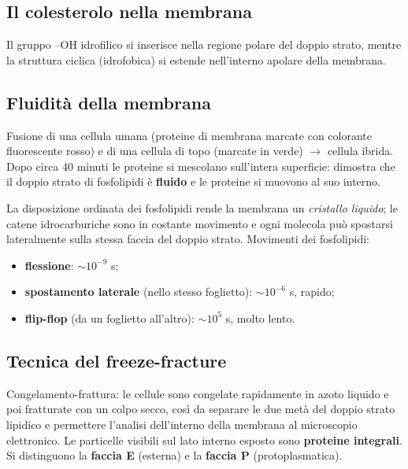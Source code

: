 \subsection{Il colesterolo nella membrana}

Il gruppo --OH idrofilico si inserisce nella regione polare del doppio strato, mentre la struttura ciclica (idrofobica) si estende nell'interno apolare della membrana.

\subsection{Fluidità della membrana}

Fusione di una cellula umana (proteine di membrana marcate con colorante fluorescente rosso) e di una cellula di topo (marcate in verde) $\rightarrow$ cellula ibrida. Dopo circa 40 minuti le proteine si mescolano sull'intera superficie: dimostra che il doppio strato di fosfolipidi è \textbf{fluido} e le proteine si muovono al suo interno.

La disposizione ordinata dei fosfolipidi rende la membrana un \textit{cristallo liquido}; le catene idrocarburiche sono in costante movimento e ogni molecola può spostarsi lateralmente sulla stessa faccia del doppio strato. Movimenti dei fosfolipidi:
\begin{itemize}
  \item \textbf{flessione}: $\sim 10^{-9}$ s;
  \item \textbf{spostamento laterale} (nello stesso foglietto): $\sim 10^{-6}$ s, rapido;
  \item \textbf{flip-flop} (da un foglietto all'altro): $\sim 10^{5}$ s, molto lento.
\end{itemize}

\subsection{Tecnica del freeze-fracture}

Congelamento-frattura: le cellule sono congelate rapidamente in azoto liquido e poi fratturate con un colpo secco, così da separare le due metà del doppio strato lipidico e permettere l'analisi dell'interno della membrana al microscopio elettronico. Le particelle visibili sul lato interno esposto sono \textbf{proteine integrali}. Si distinguono la \textbf{faccia E} (esterna) e la \textbf{faccia P} (protoplasmatica).

